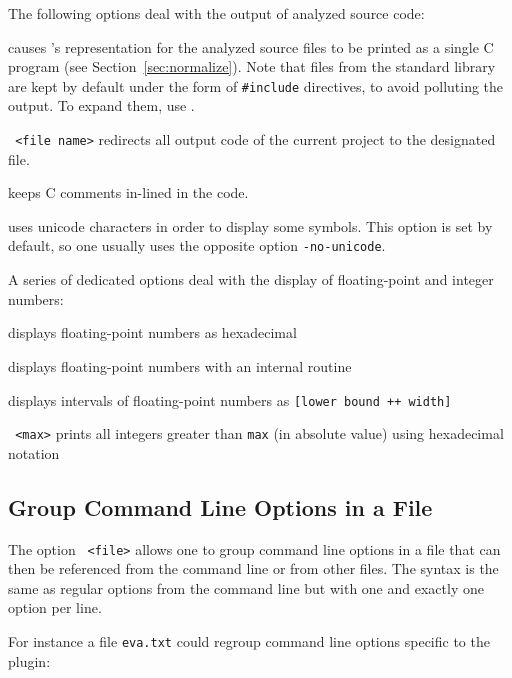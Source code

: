 The following options deal with the output of analyzed source code:
\begin{description}
\item {} causes \FramaC's representation for the analyzed
  source files to be printed as a single C program (see
  Section~\ref{sec:normalize}). Note that files from the \FramaC standard
  library are kept by default under the form of \texttt{\#include} directives,
  to avoid polluting the output. To expand them, use .
\item \texttt{ <file name>} redirects all output code of the
  current project to the designated file.
\item {} keeps C comments in-lined in the code.
\item {} uses unicode characters in order to display some
  \acsl symbols. This option is set by default, so one usually uses the opposite
  option \texttt{-no-unicode}.
\end{description}
A series of dedicated options deal with the display of floating-point and
integer numbers:
\begin{description}
\item {} displays floating-point
  numbers as hexadecimal
\item {} displays floating-point numbers
  with an internal routine
\item {} displays intervals of
  floating-point numbers as \texttt{[lower bound ++ width]}
\item \texttt{ <max>} prints all integers greater
  than \texttt{max} (in absolute value) using hexadecimal notation
\end{description}

\subsection{Group Command Line Options in a File}\label{sec:commands-file}

The option \texttt{ <file>} allows one to group
command line options in a file that can then be referenced from the command line
or from other files. The syntax is the same as regular options from the command
line but with one and exactly one option per line.

For instance a file \texttt{eva.txt} could regroup command line options specific
to the \Eva plugin:

